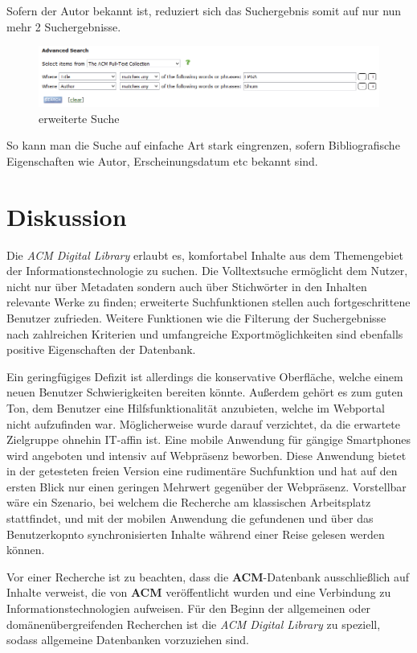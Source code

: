 \documentclass[
	ngerman,
	parskip=half,
	headsepline,
	fontsize=12pt,
	DIV=13,
	listof=leveldown,
	]{scrreprt}
\begin{document}
Sofern der Autor bekannt ist, reduziert sich das Suchergebnis somit auf nur nun mehr 2 Suchergebnisse.
\begin{figure}[ht]
\centering
\includegraphics[width=\textwidth]{img/Suche_FPGA-Shum.PNG}
\caption{erweiterte Suche}
\end{figure}
So kann man die Suche auf einfache Art stark eingrenzen, sofern Bibliografische Eigenschaften wie Autor, Erscheinungsdatum etc bekannt sind.
	
	\chapter{Diskussion}	
	
	Die \textsl{ACM Digital Library} erlaubt es, komfortabel Inhalte aus dem Themengebiet der Informationstechnologie zu suchen. Die Volltextsuche ermöglicht dem Nutzer, nicht nur über Metadaten sondern auch über Stichwörter in den Inhalten relevante Werke zu finden; erweiterte Suchfunktionen stellen auch fortgeschrittene Benutzer zufrieden. Weitere Funktionen wie die Filterung der Suchergebnisse nach zahlreichen Kriterien und umfangreiche Exportmöglichkeiten sind ebenfalls positive Eigenschaften der Datenbank. 
	
	Ein geringfügiges Defizit ist allerdings die konservative Oberfläche, welche einem neuen Benutzer Schwierigkeiten bereiten könnte. Außerdem gehört es zum guten Ton, dem Benutzer eine Hilfsfunktionalität anzubieten, welche im Webportal nicht aufzufinden war. Möglicherweise wurde darauf verzichtet, da die erwartete Zielgruppe ohnehin IT-affin ist.
	Eine mobile Anwendung für gängige Smartphones wird angeboten und intensiv auf Webpräsenz beworben. Diese Anwendung bietet in der getesteten freien Version eine rudimentäre Suchfunktion und hat auf den ersten Blick nur einen geringen Mehrwert gegenüber der Webpräsenz. Vorstellbar wäre ein Szenario, bei welchem die Recherche am klassischen Arbeitsplatz stattfindet, und mit der mobilen Anwendung die gefundenen und über das Benutzerkopnto synchronisierten Inhalte während einer Reise gelesen werden können.
	
	Vor einer Recherche ist zu beachten, dass die \textbf{ACM}-Datenbank ausschließlich auf Inhalte verweist, die von \textbf{ACM} veröffentlicht wurden und  eine Verbindung zu Informationstechnologien aufweisen. Für den Beginn der allgemeinen oder domänenübergreifenden Recherchen ist die \textsl{ACM Digital Library} zu speziell, sodass allgemeine Datenbanken vorzuziehen sind.
	
\end{document}
